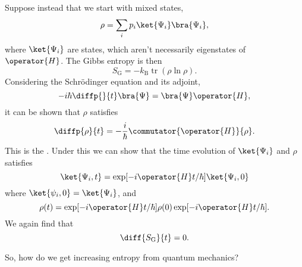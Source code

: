 \documentclass[fleqn]{NotesClass}
\newcommand*{\boltzmann}{k_{\mathrm{B}}}
\DeclareMathOperator{\tr}{tr}
\begin{document}
    Suppose instead that we start with mixed states,
    \begin{equation}
        \rho = \sum_i p_i\ket{\Psi_i}\bra{\Psi_i},
    \end{equation}
    where \(\ket{\Psi_i}\) are states, which aren't necessarily eigenstates of \(\operator{H}\).
    The Gibbs entropy is then
    \begin{equation}
        S_{\mathrm{G}} = -\boltzmann\tr(\rho\ln\rho).
    \end{equation}
    Considering the Schrödinger equation and its adjoint,
    \begin{equation}
        -i\hbar\diffp{}{t}\bra{\Psi} = \bra{\Psi}\operator{H},
    \end{equation}
    it can be shown that \(\rho\) satisfies
    \begin{equation}
        \diffp{\rho}{t} = -\frac{i}{\hbar}\commutator{\operator{H}}{\rho}.
    \end{equation}
    This is the .
    Under this we can show that the time evolution of \(\ket{\Psi_i}\) and \(\rho\) satisfies
    \begin{equation}
        \ket{\Psi_i, t} = \exp[-i\operator{H}t/\hbar]\ket{\Psi_i, 0}
    \end{equation}
    where \(\ket{\psi_i, 0} = \ket{\Psi_i}\), and
    \begin{equation}
        \rho(t) = \exp[-i\operator{H}t/\hbar]\rho(0)\exp[-i\operator{H}t/\hbar].
    \end{equation}
    We again find that
    \begin{equation}
        \diff{S_{\mathrm{G}}}{t} = 0.
    \end{equation}
    
    So, how do we get increasing entropy from quantum mechanics?
    
\end{document}
